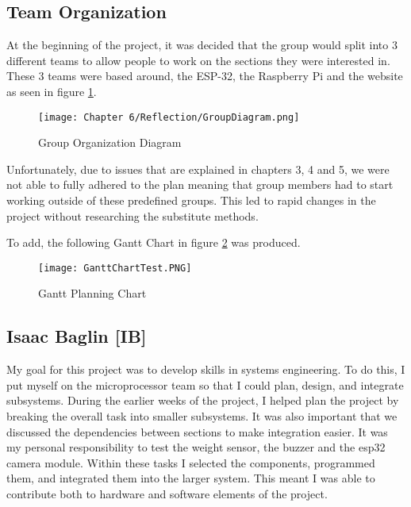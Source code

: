 \subsection{Team Organization}

At the beginning of the project, it was decided that the group would split into 3 different teams to allow people to work on the sections they were interested in.
These 3 teams were based around, the ESP-32, the Raspberry Pi and the website as seen in figure \ref{fig:grouporg}.

\begin{figure}[H]        
    \centering
    \texttt{[image: Chapter 6/Reflection/GroupDiagram.png]}
    \caption{Group Organization Diagram}
    \label{fig:grouporg}
\end{figure} 

Unfortunately, due to issues that are explained in chapters 3, 4 and 5,
we were not able to fully adhered to the plan meaning that group members had to start working outside of these predefined groups.
This led to rapid changes in the project without researching the substitute methods.

To add, the following Gantt Chart in figure \ref{fig:gantt} was produced.

\begin{figure}[H]        
    \centering
    \texttt{[image: GanttChartTest.PNG]}
    \caption{Gantt Planning Chart}
    \label{fig:gantt}
\end{figure} 

\subsection{Isaac Baglin [IB]}
My goal for this project was to develop skills in systems engineering.
To do this, I put myself on the microprocessor team so that I could plan, design, and integrate subsystems.
During the earlier weeks of the project, I helped plan the project by breaking the overall task into smaller subsystems.
It was also important that we discussed the dependencies between sections to make integration easier.
It was my personal responsibility to test the weight sensor, the buzzer and the esp32 camera module.
Within these tasks I selected the components, programmed them, and integrated them into the larger system.
This meant I was able to contribute both to hardware and software elements of the project.

